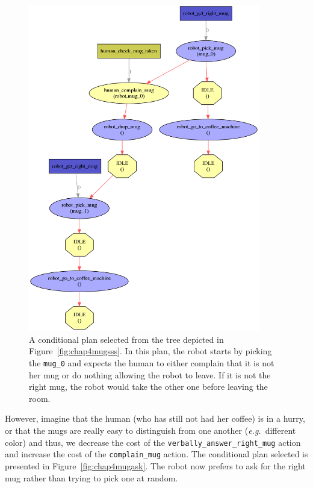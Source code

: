 \documentclass[a4paper,11pt,twoside]{StyleThese}
\begin{document}
\begin{figure}[hbtp]
\centering
\includegraphics[width=0.9\textwidth]{figures/chapter4/mug_selection_trials.png}
\caption{A conditional plan selected from the tree depicted in Figure~\ref{fig:chap4mugsss}. In this plan, the robot starts by picking the \texttt{mug\_0} and expects the human to either complain that it is not her mug or do nothing allowing the robot to leave. If it is not the right mug, the robot would take the other one before leaving the room.}
\label{fig:chap4mugtrialerror}
\end{figure}

However, imagine that the human (who has still not had her coffee) is in a hurry, or that the mugs are really easy to distinguish from one another (\textit{e.g.}~different color) and thus, we decrease the cost of the \verb'verbally_answer_right_mug' action and increase the cost of the \verb'complain_mug' action. The conditional plan selected is presented in Figure~\ref{fig:chap4mugask}. The robot now prefers to ask for the right mug rather than trying to pick one at random.
\end{document}
